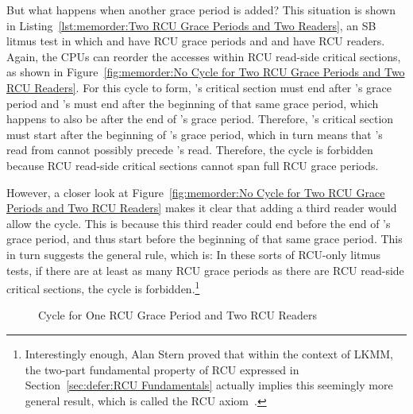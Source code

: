 But what happens when another grace period is added?
This situation is shown in
Listing~\ref{lst:memorder:Two RCU Grace Periods and Two Readers},
an SB litmus test in which  and  have RCU grace periods
and  and  have RCU readers.
Again, the CPUs can reorder the accesses within RCU read-side critical
sections, as shown in
Figure~\ref{fig:memorder:No Cycle for Two RCU Grace Periods and Two RCU Readers}.
For this cycle to form, 's critical section must
end after 's grace period and 's must end after the
beginning of that same grace period, which happens to also be after the
end of 's grace period.
Therefore, 's critical section must start after the beginning
of 's grace period, which in turn means that 's
read from  cannot possibly precede 's read.
Therefore, the cycle is forbidden because RCU read-side critical sections
cannot span full RCU grace periods.

However, a closer look at
Figure~\ref{fig:memorder:No Cycle for Two RCU Grace Periods and Two RCU Readers}
makes it clear that adding a third reader would allow the cycle.
This is because this third reader could end before the end of 's
grace period, and thus start before the beginning of that same grace
period.
This in turn suggests the general rule, which is:  In these sorts of RCU-only
litmus tests, if there are at least as many RCU grace periods as there
are RCU read-side critical sections, the cycle is forbidden.\footnote{
	Interestingly enough, Alan Stern proved that within the context
	of LKMM, the two-part fundamental property of RCU expressed
	in Section~\ref{sec:defer:RCU Fundamentals} actually implies
	this seemingly more general result, which is called the RCU
	axiom~\cite{Alglave:2018:FSC:3173162.3177156}.}

\begin{figure}[tbp]
\centering
{}
\caption{Cycle for One RCU Grace Period and Two RCU Readers}
\label{fig:memorder:Cycle for One RCU Grace Period and Two RCU Readers}
\end{figure}

